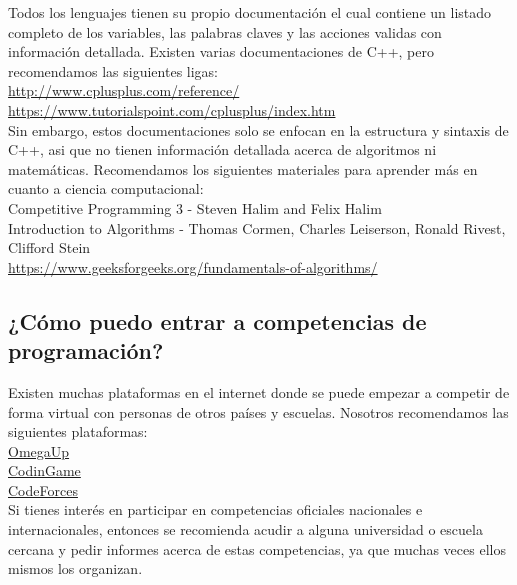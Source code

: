\documentclass{article}
\begin{document}
Todos los lenguajes tienen su propio documentación el cual contiene un listado completo de los variables, las palabras claves y las acciones validas con información detallada. Existen varias documentaciones de C++, pero recomendamos las siguientes ligas: \\

\url{http://www.cplusplus.com/reference/} \\

\url{https://www.tutorialspoint.com/cplusplus/index.htm} \\

Sin embargo, estos documentaciones solo se enfocan en la estructura y sintaxis de C++, asi que no tienen información detallada acerca de algoritmos ni matemáticas. Recomendamos los siguientes materiales para aprender más en cuanto a ciencia computacional: \\

Competitive Programming 3 - Steven Halim and Felix Halim \\

Introduction to Algorithms - Thomas Cormen, Charles Leiserson, Ronald Rivest, Clifford Stein \\

\url{https://www.geeksforgeeks.org/fundamentals-of-algorithms/} \\

\subsection{¿Cómo puedo entrar a competencias de programación?}

Existen muchas plataformas en el internet donde se puede empezar a competir de forma virtual con personas de otros países y escuelas. Nosotros recomendamos las siguientes plataformas: \\

\href{https://omegaup.com/}{OmegaUp} \\

\href{https://www.codingame.com/start}{CodinGame} \\

\href{https://codeforces.com/}{CodeForces} \\

Si tienes interés en participar en competencias oficiales nacionales e internacionales, entonces se recomienda acudir a alguna universidad o escuela cercana y pedir informes acerca de estas competencias, ya que muchas veces ellos mismos los organizan.
\end{document}
